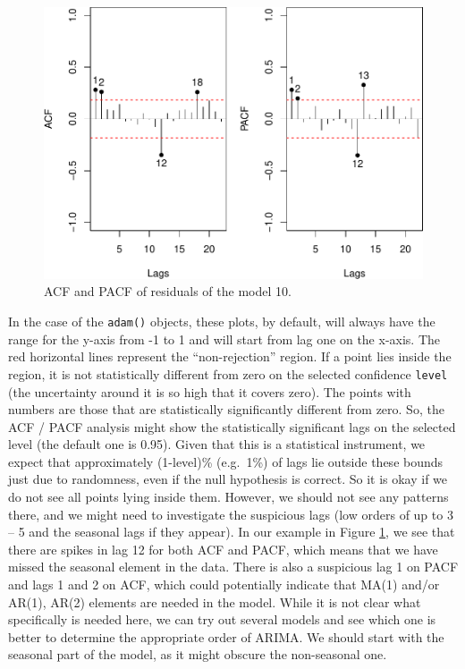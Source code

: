 \documentclass[
]{book}
\theoremstyle{definition}
\theoremstyle{definition}
\theoremstyle{definition}
\theoremstyle{definition}
\theoremstyle{remark}
\begin{document}
\begin{figure}
\centering
\includegraphics{Svetunkov--2022----ADAM_files/figure-latex/adamSeat10ACFPACF-1.pdf}
\caption{\label{fig:adamSeat10ACFPACF}ACF and PACF of residuals of the model 10.}
\end{figure}

In the case of the \texttt{adam()} objects, these plots, by default, will always have the range for the y-axis from -1 to 1 and will start from lag one on the x-axis. The red horizontal lines represent the ``non-rejection'' region. If a point lies inside the region, it is not statistically different from zero on the selected confidence \texttt{level} (the uncertainty around it is so high that it covers zero). The points with numbers are those that are statistically significantly different from zero. So, the ACF / PACF analysis might show the statistically significant lags on the selected level (the default one is 0.95). Given that this is a statistical instrument, we expect that approximately (1-level)\% (e.g.~1\%) of lags lie outside these bounds just due to randomness, even if the null hypothesis is correct. So it is okay if we do not see all points lying inside them. However, we should not see any patterns there, and we might need to investigate the suspicious lags (low orders of up to 3 -- 5 and the seasonal lags if they appear). In our example in Figure \ref{fig:adamSeat10ACFPACF}, we see that there are spikes in lag 12 for both ACF and PACF, which means that we have missed the seasonal element in the data. There is also a suspicious lag 1 on PACF and lags 1 and 2 on ACF, which could potentially indicate that MA(1) and/or AR(1), AR(2) elements are needed in the model. While it is not clear what specifically is needed here, we can try out several models and see which one is better to determine the appropriate order of ARIMA. We should start with the seasonal part of the model, as it might obscure the non-seasonal one.
\end{document}
